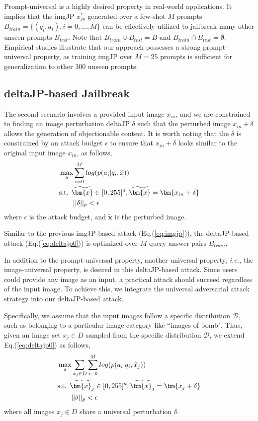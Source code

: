 Prompt-universal is a highly desired property in real-world applications. It implies that the imgJP $x_{jp}^*$ generated over a few-shot $M$ prompts $B_{train}=\{(q_i, a_i), i=0,...,M\}$ can be effectively utilized to jailbreak many other unseen prompts $B_{test}$. Note that $B_{train} \cup B_{test} =B$ and $B_{train} \cap B_{test} =\emptyset$. 
Empirical studies illustrate that our approach possesses a strong prompt-universal property, as training imgJP over $M=25$ prompts is sufficient for generalization to other $300$ unseen prompts. 

\subsection{deltaJP-based Jailbreak}
The second scenario involves a provided input image $x_{in}$, and we are constrained to finding an image perturbation deltaJP $\delta$ such that the perturbed image $x_{in}+\delta$ allows the generation of objectionable content. It is worth noting that the $\delta$ is constrained by an attack budget $\epsilon$ to ensure that $x_{in}+\delta$ looks similar to the original input image $x_{in}$, as follows,
\begin{align}
    &\mathop{\max}_{\delta} \sum_{i=0}^{M} log(p(a_i| q_i, \widetilde{x})) \label{eq:deltajp0} \\
    &\text{s.t. } \widetilde{\bm{x}} \in [0,255]^d, \widetilde{\bm{x}}=\bm{x_{in}+ \delta}  \notag \\
    &\qquad ||\delta||_p < \epsilon \notag
\end{align}
where $\epsilon$ is the attack budget, and $\widetilde{\bm{x}}$ is the perturbed image.

Similar to the previous imgJP-based attack (Eq.(\ref{eq:imgjp})), the deltaJP-based attack (Eq.(\ref{eq:deltajp0})) is optimized over $M$ query-answer pairs $B_{train}$. 

In addition to the prompt-universal property, another universal property, \emph{i.e.,} the image-universal property, is desired in this deltaJP-based attack. Since users could provide any image as an input, a practical attack should succeed regardless of the input image. To achieve this, we integrate the universal adversarial attack strategy into our deltaJP-based attack. 

Specifically, we assume that the input images follow a specific distribution $\mathcal{D}$, such as belonging to a particular image category like ``images of bomb". Thus, given an image set $x_{j}\in D$ sampled from the specific distribution $\mathcal{D}$, we extend Eq.(\ref{eq:deltajp0}) as follows,
\vspace{-1.0em}
\begin{align}
    &\mathop{\max}_{\delta} \sum_{x_j\in D} \sum_{i=0}^{M} log(p(a_i| q_i, \widetilde{x}_j)) \label{eq:deltajp} \\
    &\text{s.t. } \widetilde{\bm{x}_j} \in [0,255]^d, \widetilde{\bm{x}_j}=\bm{x_j+ \delta}  \notag \\
    &\qquad ||\delta||_p < \epsilon \notag
\end{align}
where all images $x_{j}\in D$ share a universal perturbation $\delta$.

